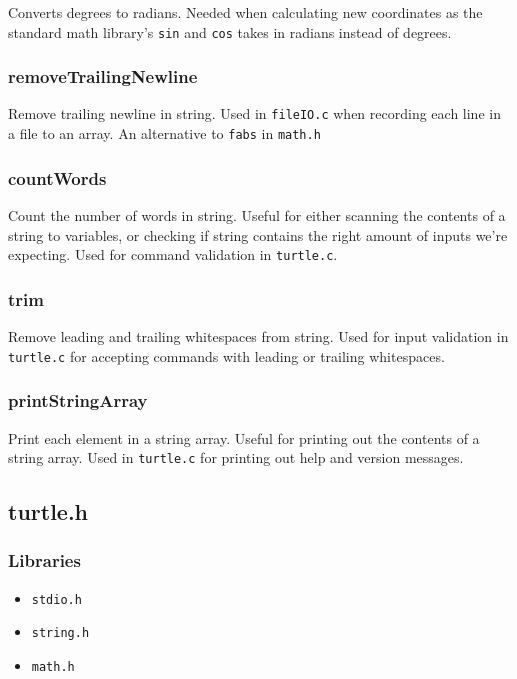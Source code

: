 \documentclass[a4paper, 12pt, titlepage]{article}
\newcommand{\code}[1]{\small\texttt{#1}\normalsize}
\begin{document}
Converts degrees to radians. Needed when calculating new coordinates as 
the standard math library's \code{sin} and \code{cos} takes in radians 
instead of degrees.

\subsubsection{removeTrailingNewline}

Remove trailing newline in string. Used in \code{fileIO.c} when recording 
each line in a file to an array. An alternative to \code{fabs} in 
\code{math.h}

\subsubsection{countWords}

Count the number of words in string. Useful for either scanning the contents 
of a string to variables, or checking if string contains the right amount of 
inputs we're expecting. Used for command validation in \code{turtle.c}.

\subsubsection{trim}

Remove leading and trailing whitespaces from string. Used for input 
validation in \code{turtle.c} for accepting commands with leading or trailing 
whitespaces.

\subsubsection{printStringArray}

Print each element in a string array. Useful for printing out the contents 
of a string array. Used in \code{turtle.c} for printing out help and version 
messages.

\pagebreak
\subsection{turtle.h}
\subsubsection{Libraries}

\begin{itemize}[label={--}, noitemsep]
    \item \code{stdio.h}
    \item \code{string.h}
    \item \code{math.h}
\end{itemize}
\end{document}
